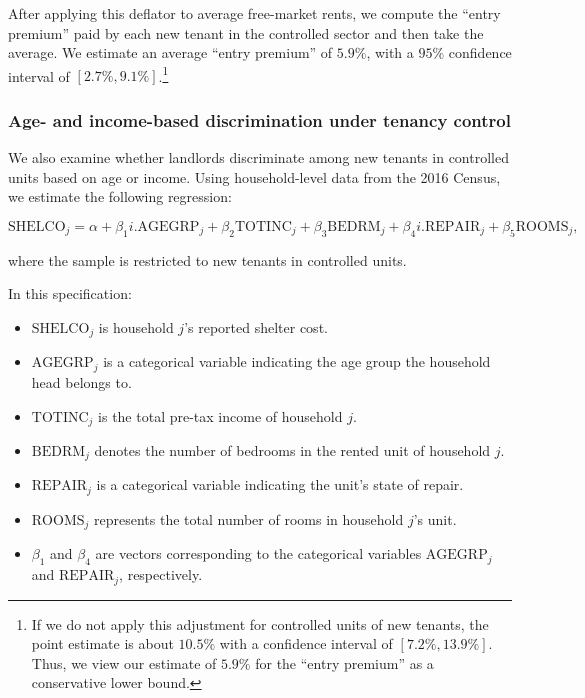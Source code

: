 After applying this deflator to average free-market rents, we compute the ``entry premium'' paid by each new tenant in the controlled sector and then take the average. We estimate an average ``entry premium'' of $5.9\%$, with a $95\%$ confidence interval of $[2.7\%, 9.1\%]$.\footnote{If we do not apply this adjustment for controlled units of new tenants, the point estimate is about $10.5\%$ with a confidence interval of $[7.2\%,13.9\%]$. Thus, we view our estimate of $5.9\%$ for the ``entry premium'' as a conservative lower bound.}

\subsubsection{Age- and income-based discrimination under tenancy control}\label{section:appendix_discrimination}

We also examine whether landlords discriminate among new tenants in controlled units based on age or income. Using household-level data from the 2016 Census, we estimate the following regression:

\begin{equation*}
\text{SHELCO}_j = \alpha + \beta_1 i.\text{AGEGRP}_j + \beta_2 \text{TOTINC}_j + \beta_3 \text{BEDRM}_j + \beta_4 i.\text{REPAIR}_j + \beta_5 \text{ROOMS}_j, 
\end{equation*}

\noindent where the sample is restricted to new tenants in controlled units. %

In this specification:

\begin{itemize} 
    \item $\text{SHELCO}_j$ is household $j$'s reported shelter cost. 
    \item $\text{AGEGRP}_j$ is a categorical variable indicating the age group the household head belongs to. 
    \item $\text{TOTINC}_j$ is the total pre-tax income of household $j$. 
    \item $\text{BEDRM}_j$ denotes the number of bedrooms in the rented unit of household $j$. 
    \item $\text{REPAIR}_j$ is a categorical variable indicating the unit’s state of repair. 
    \item $\text{ROOMS}_j$ represents the total number of rooms in household $j$'s unit. 
    \item $\beta_1$ and $\beta_4$ are vectors corresponding to the categorical variables $\text{AGEGRP}_j$ and $\text{REPAIR}_j$, respectively. 
\end{itemize}

